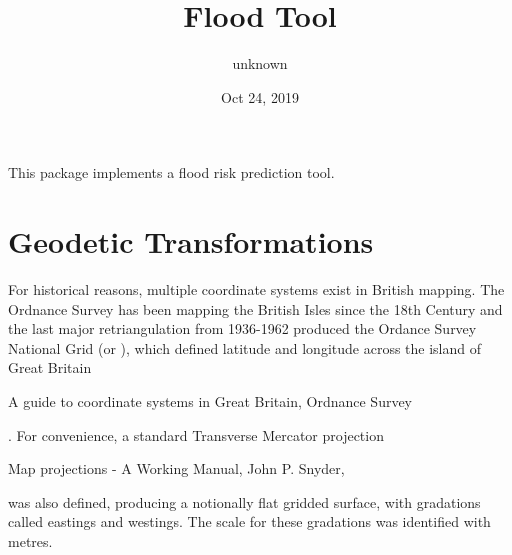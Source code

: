 \documentclass[letterpaper,10pt,english]{sphinxmanual}
\title{Flood Tool}
\date{Oct 24, 2019}
\author{unknown}
\begin{document}
\pagestyle{empty}
\sphinxmaketitle
\pagestyle{plain}
\sphinxtableofcontents
\pagestyle{normal}
\label{\detokenize{index::doc}}


This package implements a flood risk prediction tool.


\chapter{Geodetic Transformations}
\label{\detokenize{index:geodetic-transformations}}
For historical reasons, multiple coordinate systems exist in British mapping.
The Ordnance Survey has been mapping the British Isles since the 18th Century
and the last major retriangulation from 1936-1962 produced the Ordance Survey
National Grid (or ), which defined latitude and longitude across the
island of Great Britain %
\begin{footnote}[1]\sphinxAtStartFootnote
A guide to coordinate systems in Great Britain, Ordnance Survey
%
\end{footnote}. For convenience, a standard Transverse Mercator
projection %
\begin{footnote}[2]\sphinxAtStartFootnote
Map projections - A Working Manual, John P. Snyder, 
%
\end{footnote} was also defined, producing a notionally flat gridded surface,
with gradations called eastings and westings. The scale for these gradations
was identified with metres.
\end{document}
